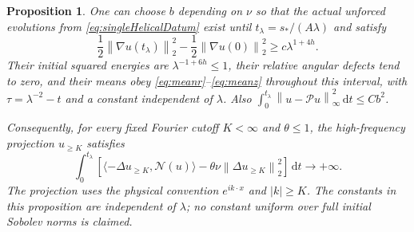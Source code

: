 \documentclass[11pt]{article}
\newtheorem{proposition}[theorem]{Proposition}
\theoremstyle{remark}
\newcommand{\PP}{\mathcal P}
\newcommand{\dd}{\,\mathrm d}
\newcommand{\norm}[1]{\left\lVert#1\right\rVert}
\begin{document}
\begin{proposition}\label{prop:totalHelicalWork}
One can choose $b$ depending on $\nu$ so that the actual unforced
evolutions from \eqref{eq:singleHelicalDatum} exist until
$t_\lambda=s_*/(A\lambda)$ and satisfy
\begin{equation}\label{eq:totalHelicalGain}
 \frac12\norm{\nabla u(t_\lambda)}_2^2
       -\frac12\norm{\nabla u(0)}_2^2\geq c\lambda^{1+4h}.
\end{equation}
Their initial squared energies are $\lambda^{-1+6h}\leq1$, their
relative angular defects tend to zero, and their means obey
\eqref{eq:meanr}--\eqref{eq:meanz} throughout this interval, with
$\tau=\lambda^{-2}-t$ and a constant independent of $\lambda$.
Also $\int_0^{t_\lambda}\norm{u-\PP u}_\infty^2\dd t\leq Cb^2$.

Consequently, for every fixed Fourier cutoff $K<\infty$ and
$\theta\leq1$, the high-frequency projection $u_{\geq K}$ satisfies
\begin{equation}\label{eq:totalHelicalTail}
 \int_0^{t_\lambda}
 \left[\langle-\Delta u_{\geq K},\mathcal N(u)\rangle
              -\theta\nu\norm{\Delta u_{\geq K}}_2^2\right]\dd t
                            \longrightarrow+\infty.
\end{equation}
The projection uses the physical convention $e^{ik\cdot x}$ and
$|k|\geq K$. The constants in this proposition are independent of
$\lambda$; no constant uniform over full initial Sobolev norms is claimed.
\end{proposition}
\end{document}
